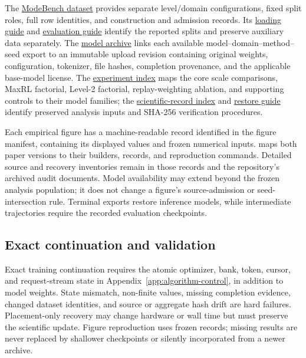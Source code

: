 The \href{https://huggingface.co/datasets/od2961/ModeBench}{ModeBench dataset}
provides separate level/domain configurations, fixed split roles, full row
identities, and construction and admission records. Its
\href{https://huggingface.co/datasets/od2961/ModeBench\#loading}{loading guide}
and \href{https://huggingface.co/datasets/od2961/ModeBench\#evaluation}{evaluation guide}
identify the reported splits and preserve auxiliary data separately.
The \href{https://huggingface.co/od2961/maxent-grpo-models}{model archive}
links each available model--domain--method--seed export to an immutable
upload revision containing original weights, configuration, tokenizer,
file hashes, completion provenance, and the applicable base-model license.
The \href{https://huggingface.co/od2961/maxent-grpo-models/blob/main/EXPERIMENTS.md}{experiment index}
maps the core scale comparisons, MaxRL factorial, Level-2 factorial,
replay-weighting ablation, and supporting controls to their model families;
the \href{https://huggingface.co/od2961/maxent-grpo-models/blob/main/DATA.md}{scientific-record index}
and \href{https://huggingface.co/od2961/maxent-grpo-models/blob/main/RESTORE.md}{restore guide}
identify preserved analysis inputs and SHA-256 verification procedures.

Each empirical figure has a machine-readable record identified in the
figure manifest, containing its displayed values and frozen numerical inputs.
 maps both paper versions to their builders,
records, and reproduction commands. Detailed source and recovery inventories
remain in those records and the repository's archived audit documents.
Model availability may extend beyond the frozen analysis population; it
does not change a figure's source-admission or seed-intersection rule.
Terminal exports restore inference models, while intermediate trajectories
require the recorded evaluation checkpoints.

\subsection{Exact continuation and validation}
\label{app:repro-recovery}

Exact training continuation requires the atomic optimizer, bank, token,
cursor, and request-stream state in Appendix~\ref{app:algorithm-control},
in addition to model weights. State mismatch, non-finite values, missing
completion evidence, changed dataset identities, and source or aggregate
hash drift are hard failures. Placement-only recovery may change hardware
or wall time but must preserve the scientific update. Figure reproduction
uses frozen records; missing results are never replaced by shallower
checkpoints or silently incorporated from a newer archive.

